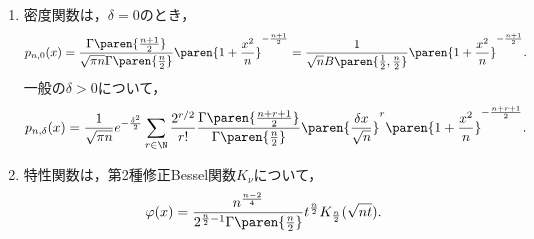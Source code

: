 \documentclass[uplatex,dvipdfmx]{jsreport}
\begin{document}
\begin{proposition}[密度関数と特性関数]\mbox{}
    \begin{enumerate}
        \item 密度関数は，$\delta=0$のとき，
        \[p_{n,0}(x)=\frac{\Gamma\paren{\frac{n+1}{2}}}{\sqrt{\pi n}\Gamma\paren{\frac{n}{2}}}\paren{1+\frac{x^2}{n}}^{-\frac{n+1}{2}}=\frac{1}{\sqrt{n}B\paren{\frac{1}{2},\frac{n}{2}}}\paren{1+\frac{x^2}{n}}^{-\frac{n+1}{2}}.\]
        一般の$\delta>0$について，
        \[p_{n,\delta}(x)=\frac{1}{\sqrt{\pi n}}e^{-\frac{\delta^2}{2}}\sum_{r\in\N}\frac{2^{r/2}}{r!}\frac{\Gamma\paren{\frac{n+r+1}{2}}}{\Gamma\paren{\frac{n}{2}}}\paren{\frac{\delta x}{\sqrt{n}}}^r\paren{1+\frac{x^2}{n}}^{-\frac{n+r+1}{2}}.\]
        \item 特性関数は，第2種修正Bessel関数$K_\nu$について，
        \[\varphi(x)=\frac{n^{\frac{n-2}{4}}}{2^{\frac{n}{2}-1}\Gamma\paren{\frac{n}{2}}}t^{\frac{n}{2}}K_{\frac{n}{2}}(\sqrt{nt}).\]
    \end{enumerate}
\end{proposition}
\end{document}
